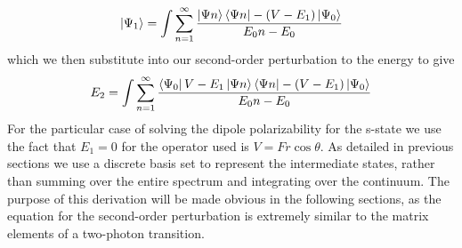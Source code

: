 \begin{equation}
    \ket{\Psi_1}=\int\sum_{n=1}^\infty \frac{\ket{\Psi n}\bra{\Psi n} -(V-E_1)\ket{\Psi_0}}{E_0 n-E_0}
\end{equation}
which we then substitute into our second-order perturbation to the energy to give
\begin{equation}
    E_2=\int\sum_{n=1}^\infty \frac{\bra{\Psi_0}V-E_1\ket{\Psi n}\bra{\Psi n} -(V-E_1)\ket{\Psi_0}}{E_0 n-E_0}
\end{equation}
For the particular case of solving the dipole polarizability for the s-state we use the fact that $E_1=0$ for the operator used is $V=Fr\cos{\theta}$. As detailed in previous sections we use a discrete basis set to represent the intermediate states, rather than summing over the entire spectrum and integrating over the continuum. The purpose of this derivation will be made obvious in the following sections, as the equation for the second-order perturbation is extremely similar to the matrix elements of a two-photon transition.

